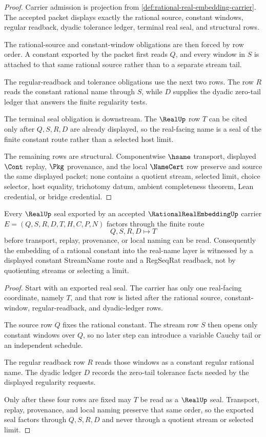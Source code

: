 \begin{proof}
Carrier admission is projection from \autoref{def:rational-real-embedding-carrier}. The accepted packet displays exactly the rational source, constant windows, regular readback, dyadic tolerance ledger, terminal real seal, and structural rows.

The rational-source and constant-window obligations are then forced by row order. A constant exported by the packet first reads $Q$, and every window in $S$ is attached to that same rational source rather than to a separate stream tail.

The regular-readback and tolerance obligations use the next two rows. The row $R$ reads the constant rational name through $S$, while $D$ supplies the dyadic zero-tail ledger that answers the finite regularity tests.

The terminal seal obligation is downstream. The $\RealUp$ row $T$ can be cited only after $Q,S,R,D$ are already displayed, so the real-facing name is a seal of the finite constant route rather than a selected host limit.

The remaining rows are structural. Componentwise $\hsame$ transport, displayed $\Cont$ replay, $\Pkg$ provenance, and the local $\NameCert$ row preserve and source the same displayed packet; none contains a quotient stream, selected limit, choice selector, host equality, trichotomy datum, ambient completeness theorem, Lean credential, or bridge credential.
\end{proof}

\begin{theorem}
\label{thm:rational-real-embedding-real-seal-factorization}
Every $\RealUp$ seal exported by an accepted $\RationalRealEmbeddingUp$ carrier $E=(Q,S,R,D,T,H,C,P,N)$ factors through the finite route
$$
Q,S,R,D \longmapsto T
$$
before transport, replay, provenance, or local naming can be read. Consequently the embedding of a rational constant into the real-name layer is witnessed by a displayed constant StreamName route and a RegSeqRat readback, not by quotienting streams or selecting a limit.
\end{theorem}
\begin{proof}
Start with an exported real seal. The carrier has only one real-facing coordinate, namely $T$, and that row is listed after the rational source, constant-window, regular-readback, and dyadic-ledger rows.

The source row $Q$ fixes the rational constant. The stream row $S$ then opens only constant windows over $Q$, so no later step can introduce a variable Cauchy tail or an independent schedule.

The regular readback row $R$ reads those windows as a constant regular rational name. The dyadic ledger $D$ records the zero-tail tolerance facts needed by the displayed regularity requests.

Only after these four rows are fixed may $T$ be read as a $\RealUp$ seal. Transport, replay, provenance, and local naming preserve that same order, so the exported seal factors through $Q,S,R,D$ and never through a quotient stream or selected limit.
\end{proof}

